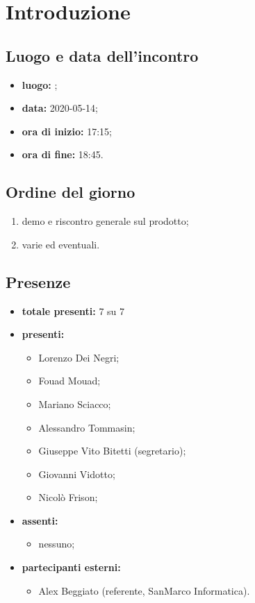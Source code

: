 \section*{Introduzione}

\subsection*{Luogo e data dell'incontro}
	\begin{itemize}
		\item \textbf{luogo:} ;
		\item \textbf{data:} 2020-05-14;
		\item \textbf{ora di inizio:} 17:15;
		\item \textbf{ora di fine:} 18:45.
	\end{itemize}

\subsection*{Ordine del giorno}
	\begin{enumerate}
		\item demo e riscontro generale sul prodotto;
  		\item varie ed eventuali.
	\end{enumerate}

\subsection*{Presenze}
	\begin{itemize}
		\item \textbf{totale presenti:} 7 su 7
		\item \textbf{presenti: }
			\begin{itemize}
				\item Lorenzo Dei Negri;
				\item Fouad Mouad;
				\item Mariano Sciacco;
				\item Alessandro Tommasin;
				\item Giuseppe Vito Bitetti (segretario);
				\item Giovanni Vidotto;
				\item Nicolò Frison;
			\end{itemize}
		\item \textbf{assenti: }
			\begin{itemize}
				\item nessuno;
			\end{itemize}
		\item  \textbf{partecipanti esterni:}
			\begin{itemize}
				\item Alex Beggiato (referente, SanMarco Informatica).
			\end{itemize}
	\end{itemize}


